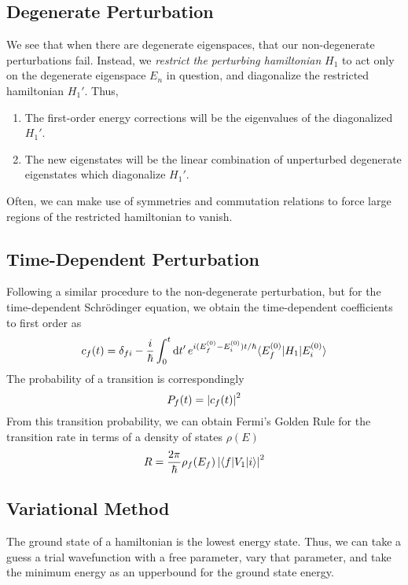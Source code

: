 \documentclass{article}
\begin{document}
\subsection{Degenerate Perturbation}
We see that when there are degenerate eigenspaces, that our non-degenerate perturbations fail. Instead, we \emph{restrict the perturbing hamiltonian} \(H_1\) to act only on the degenerate eigenspace \(E_n\) in question, and diagonalize the restricted hamiltonian \(H_1'\). Thus,
\begin{enumerate}
	\item The first-order energy corrections will be the eigenvalues of the diagonalized \(H_1'\).
	\item The new eigenstates will be the linear combination of unperturbed degenerate eigenstates which diagonalize \(H_1'\).
\end{enumerate}
Often, we can make use of symmetries and commutation relations to force large regions of the restricted hamiltonian to vanish.
\subsection{Time-Dependent Perturbation}
Following a similar procedure to the non-degenerate perturbation, but for the time-dependent Schr\"odinger equation, we obtain the time-dependent coefficients to first order as
\begin{equation}
	c_f(t)=\delta_{fi} - \frac{i}{\hbar}\int_0^t\d{t'} e^{i(E_f^{(0)}-E_i^{(0)})t/\hbar}\b{E_f^{(0)}} H_1\k{E_i^{(0)}}
\end{equation}
The probability of a transition is correspondingly 
\begin{equation}
	P_f(t) = \left|c_f(t)\right|^2
\end{equation}
From this transition probability, we can obtain Fermi's Golden Rule for the transition rate in terms of a density of states \(\rho(E)\)
\begin{equation}
	R = \frac{2\pi}{\hbar}\rho_f(E_f)\left|\langle f\rvert V_1\lvert i\rangle\right|^2
\end{equation}

\subsection{Variational Method}
The ground state of a hamiltonian is the lowest energy state. Thus, we can take a guess a trial wavefunction with a free parameter, vary that parameter, and take the minimum energy as an upperbound for the ground state energy.
\end{document}
